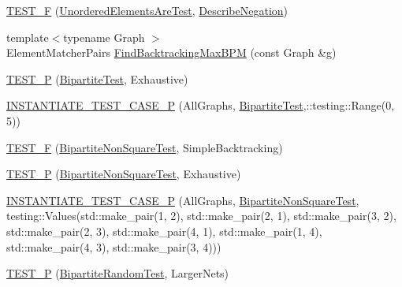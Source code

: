 \begin{DoxyCompactItemize}
\item 
\hyperlink{namespacetesting_1_1gmock__matchers__test_a3c4c92b68a08c5d541e46ed367e216ab}{T\+E\+S\+T\+\_\+F} (\hyperlink{classtesting_1_1gmock__matchers__test_1_1UnorderedElementsAreTest}{Unordered\+Elements\+Are\+Test}, \hyperlink{namespacetesting_1_1gmock__matchers__test_afbc8022da5a58aa467ec414ab3e90908}{Describe\+Negation})
\item 
{\footnotesize template$<$typename Graph $>$ }\\Element\+Matcher\+Pairs \hyperlink{namespacetesting_1_1gmock__matchers__test_a09321a8d4a4c40ab1e369fbdf92b0414}{Find\+Backtracking\+Max\+B\+PM} (const Graph \&g)
\item 
\hyperlink{namespacetesting_1_1gmock__matchers__test_a20589d957fcfe5399e249084dbc23e82}{T\+E\+S\+T\+\_\+P} (\hyperlink{classtesting_1_1gmock__matchers__test_1_1BipartiteTest}{Bipartite\+Test}, Exhaustive)
\item 
\hyperlink{namespacetesting_1_1gmock__matchers__test_a3ca71a91f2b60ab08922acb7da0f8df0}{I\+N\+S\+T\+A\+N\+T\+I\+A\+T\+E\+\_\+\+T\+E\+S\+T\+\_\+\+C\+A\+S\+E\+\_\+P} (All\+Graphs, \hyperlink{classtesting_1_1gmock__matchers__test_1_1BipartiteTest}{Bipartite\+Test},\+::testing\+::\+Range(0, 5))
\item 
\hyperlink{namespacetesting_1_1gmock__matchers__test_a7d2395b1cb6a90bdc8d46ae06f99f6c7}{T\+E\+S\+T\+\_\+F} (\hyperlink{classtesting_1_1gmock__matchers__test_1_1BipartiteNonSquareTest}{Bipartite\+Non\+Square\+Test}, Simple\+Backtracking)
\item 
\hyperlink{namespacetesting_1_1gmock__matchers__test_a3ac913ed55a7ac2636ae7bfce04296e9}{T\+E\+S\+T\+\_\+P} (\hyperlink{classtesting_1_1gmock__matchers__test_1_1BipartiteNonSquareTest}{Bipartite\+Non\+Square\+Test}, Exhaustive)
\item 
\hyperlink{namespacetesting_1_1gmock__matchers__test_a64ef722e930c3088ddea704ac20194b5}{I\+N\+S\+T\+A\+N\+T\+I\+A\+T\+E\+\_\+\+T\+E\+S\+T\+\_\+\+C\+A\+S\+E\+\_\+P} (All\+Graphs, \hyperlink{classtesting_1_1gmock__matchers__test_1_1BipartiteNonSquareTest}{Bipartite\+Non\+Square\+Test}, testing\+::\+Values(std\+::make\+\_\+pair(1, 2), std\+::make\+\_\+pair(2, 1), std\+::make\+\_\+pair(3, 2), std\+::make\+\_\+pair(2, 3), std\+::make\+\_\+pair(4, 1), std\+::make\+\_\+pair(1, 4), std\+::make\+\_\+pair(4, 3), std\+::make\+\_\+pair(3, 4)))
\item 
\hyperlink{namespacetesting_1_1gmock__matchers__test_ace6351a5a34b746491458140b06534ed}{T\+E\+S\+T\+\_\+P} (\hyperlink{classtesting_1_1gmock__matchers__test_1_1BipartiteRandomTest}{Bipartite\+Random\+Test}, Larger\+Nets)

\end{DoxyCompactItemize}
